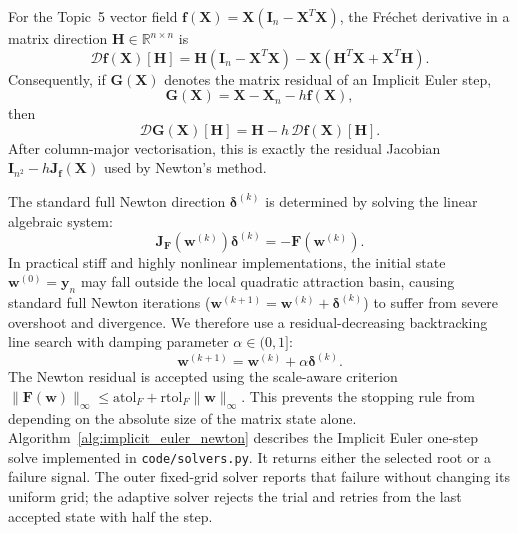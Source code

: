 \documentclass[11pt,a4paper]{article}
\theoremstyle{definition}
\theoremstyle{remark}
\begin{document}
For the Topic~5 vector field
$\mathbf{f}(\mathbf{X})=\mathbf{X}(\mathbf{I}_n-\mathbf{X}^T\mathbf{X})$,
the Fr\'echet derivative in a matrix direction
$\mathbf{H}\in\mathbb{R}^{n\times n}$ is
\begin{equation}
\label{eq:topic5_frechet_derivative}
\mathcal{D}\mathbf{f}(\mathbf{X})[\mathbf{H}]
=\mathbf{H}(\mathbf{I}_n-\mathbf{X}^T\mathbf{X})
-\mathbf{X}(\mathbf{H}^T\mathbf{X}+\mathbf{X}^T\mathbf{H}).
\end{equation}
Consequently, if $\mathbf{G}(\mathbf{X})$ denotes the matrix residual of
an Implicit Euler step,
\begin{equation}
\label{eq:topic5_matrix_residual}
\mathbf{G}(\mathbf{X})=\mathbf{X}-\mathbf{X}_n-h\mathbf{f}(\mathbf{X}),
\end{equation}
then
\begin{equation}
\label{eq:topic5_residual_frechet}
\mathcal{D}\mathbf{G}(\mathbf{X})[\mathbf{H}]
=\mathbf{H}-h\,\mathcal{D}\mathbf{f}(\mathbf{X})[\mathbf{H}].
\end{equation}
After column-major vectorisation, this is exactly the residual Jacobian
$\mathbf{I}_{n^2}-h\mathbf{J}_{\mathbf f}(\mathbf X)$ used by Newton's method.

The standard full Newton direction $\boldsymbol{\delta}^{(k)}$ is determined by solving the linear algebraic system:
\begin{equation}
\label{eq:newton_linear_system}
\mathbf{J}_{\mathbf{F}}\left(\mathbf{w}^{(k)}\right) \boldsymbol{\delta}^{(k)} = -\mathbf{F}\left(\mathbf{w}^{(k)}\right).
\end{equation}
In practical stiff and highly nonlinear implementations, the initial state $\mathbf{w}^{(0)} = \mathbf{y}_n$ may fall outside the local quadratic attraction basin, causing standard full Newton iterations ($\mathbf{w}^{(k+1)} = \mathbf{w}^{(k)} + \boldsymbol{\delta}^{(k)}$) to suffer from severe overshoot and divergence. We therefore use a residual-decreasing backtracking line search with damping parameter $\alpha \in (0,1]$:
\begin{equation}
\label{eq:newton_damped_update}
\mathbf{w}^{(k+1)} = \mathbf{w}^{(k)} + \alpha \boldsymbol{\delta}^{(k)}.
\end{equation}
The Newton residual is accepted using the scale-aware criterion
$\|\mathbf{F}(\mathbf{w})\|_\infty\le
\mathrm{atol}_F+\mathrm{rtol}_F\|\mathbf{w}\|_\infty$.
This prevents the stopping rule from depending on the absolute size of
the matrix state alone.
Algorithm~\ref{alg:implicit_euler_newton} describes the Implicit Euler
one-step solve implemented in \texttt{code/solvers.py}. It returns either
the selected root or a failure signal. The outer fixed-grid solver reports
that failure without changing its uniform grid; the adaptive solver rejects
the trial and retries from the last accepted state with half the step.
\end{document}
